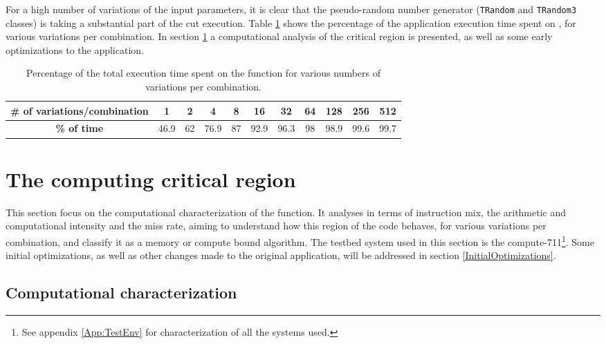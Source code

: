 For a high number of variations of the input parameters, it is clear that the pseudo-random number generator (\texttt{TRandom} and \texttt{TRandom3} classes) is taking a substantial part of the cut execution. Table \ref{tab:TempoKinFit} shows the percentage of the application execution time spent on \ttDilepKinFit, for various variations per combination. In section \ref{CriticalRegion} a computational analysis of the critical region is presented, as well as some early optimizations to the application.

\begin{table}[!htp]
	\begin{center}
		\begin{tabular}{|c|c|c|c|c|c|c|c|c|c|c|}
			\hline
			\textbf{\# of variations/combination} & 1 & 2 & 4 & 8 & 16 & 32 & 64 & 128 & 256 & 512 \\ \hline
			\textbf{\% of time} & 46.9 & 62 & 76.9 & 87 & 92.9 & 96.3 & 98 & 98.9 & 99.6 & 99.7 \\ \hline
		\end{tabular}
		\caption{Percentage of the total execution time spent on the \ttDilepKinFit function for various numbers of variations per combination.}
		\label{tab:TempoKinFit}
	\end{center}
\end{table}

\section{The computing critical region}
\label{CriticalRegion}

This section focus on the computational characterization of the \ttDilepKinFit function. It analyses in terms of instruction mix, the arithmetic and computational intensity and the miss rate, aiming to understand how this region of the code behaves, for various variations per combination, and classify it as a memory or compute bound algorithm. The testbed system used in this section is the compute-711\footnote{See appendix \ref{App:TestEnv} for characterization of all the systems used.}. Some initial optimizations, as well as other changes made to the original application, will be addressed in section \ref{InitialOptimizations}.

\subsection{Computational characterization}
\label{ComputationalCharactrization}

